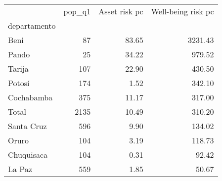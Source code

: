 \begin{tabular}{lrrr}
\toprule
{} &  pop\_q1 &  Asset risk pc &  Well-being risk pc \\
departamento &         &                &                     \\
\midrule
Beni         &      87 &          83.65 &             3231.43 \\
Pando        &      25 &          34.22 &              979.52 \\
Tarija       &     107 &          22.90 &              430.50 \\
Potosí       &     174 &           1.52 &              342.10 \\
Cochabamba   &     375 &          11.17 &              317.00 \\
Total        &    2135 &          10.49 &              310.20 \\
Santa Cruz   &     596 &           9.90 &              134.02 \\
Oruro        &     104 &           3.19 &              118.73 \\
Chuquisaca   &     104 &           0.31 &               92.42 \\
La Paz       &     559 &           1.85 &               50.67 \\
\bottomrule
\end{tabular}
